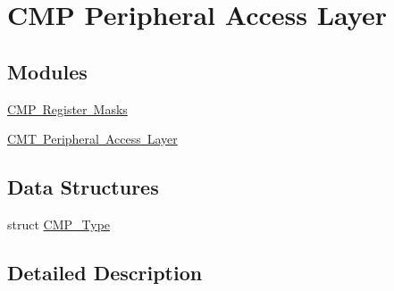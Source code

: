 \hypertarget{group___c_m_p___peripheral___access___layer}{}\section{C\+MP Peripheral Access Layer}
\label{group___c_m_p___peripheral___access___layer}
\subsection*{Modules}
\begin{DoxyCompactItemize}
\item 
\mbox{\hyperlink{group___c_m_p___register___masks}{C\+M\+P Register Masks}}
\item 
\mbox{\hyperlink{group___c_m_t___peripheral___access___layer}{C\+M\+T Peripheral Access Layer}}
\end{DoxyCompactItemize}
\subsection*{Data Structures}
\begin{DoxyCompactItemize}
\item 
struct \mbox{\hyperlink{struct_c_m_p___type}{C\+M\+P\+\_\+\+Type}}
\end{DoxyCompactItemize}


\subsection{Detailed Description}
